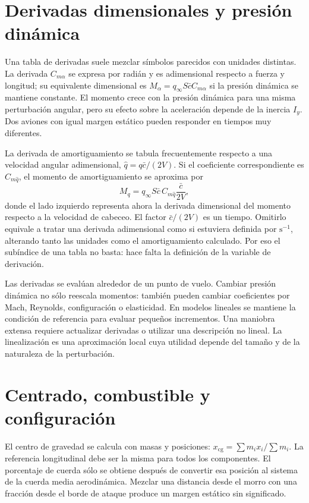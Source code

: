 \section{Derivadas dimensionales y presión dinámica}
Una tabla de derivadas suele mezclar símbolos parecidos con unidades distintas. La derivada $C_{m\alpha}$ se expresa por radián y es adimensional respecto a fuerza y longitud; su equivalente dimensional es $M_\alpha=q_\infty S\bar c C_{m\alpha}$ si la presión dinámica se mantiene constante. El momento crece con la presión dinámica para una misma perturbación angular, pero su efecto sobre la aceleración depende de la inercia $I_y$. Dos aviones con igual margen estático pueden responder en tiempos muy diferentes.

La derivada de amortiguamiento se tabula frecuentemente respecto a una velocidad angular adimensional, $\hat q=q\bar c/(2V)$. Si el coeficiente correspondiente es $C_{m\hat q}$, el momento de amortiguamiento se aproxima por
\begin{equation}
M_{q}=q_\infty S\bar c\,C_{m\hat q}\frac{\bar c}{2V},
\end{equation}
donde el lado izquierdo representa ahora la derivada dimensional del momento respecto a la velocidad de cabeceo. El factor $\bar c/(2V)$ es un tiempo. Omitirlo equivale a tratar una derivada adimensional como si estuviera definida por $\mathrm{s^{-1}}$, alterando tanto las unidades como el amortiguamiento calculado. Por eso el subíndice de una tabla no basta: hace falta la definición de la variable de derivación.

Las derivadas se evalúan alrededor de un punto de vuelo. Cambiar presión dinámica no sólo reescala momentos: también pueden cambiar coeficientes por Mach, Reynolds, configuración o elasticidad. En modelos lineales se mantiene la condición de referencia para evaluar pequeños incrementos. Una maniobra extensa requiere actualizar derivadas o utilizar una descripción no lineal. La linealización es una aproximación local cuya utilidad depende del tamaño y de la naturaleza de la perturbación.

\section{Centrado, combustible y configuración}
El centro de gravedad se calcula con masas y posiciones: $x_{\mathrm{cg}}=\sum m_ix_i/\sum m_i$. La referencia longitudinal debe ser la misma para todos los componentes. El porcentaje de cuerda sólo se obtiene después de convertir esa posición al sistema de la cuerda media aerodinámica. Mezclar una distancia desde el morro con una fracción desde el borde de ataque produce un margen estático sin significado.


